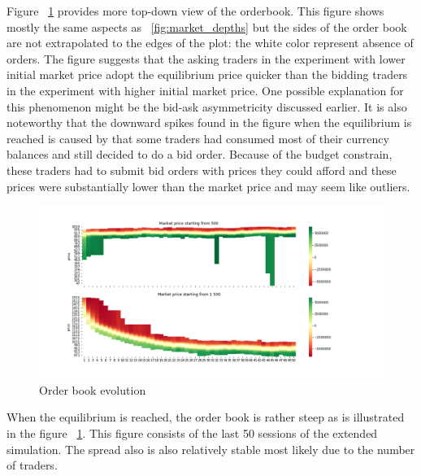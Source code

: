 Figure ~\ref{fig:basic_orderbook_evo} provides more top-down view of the orderbook.
This figure shows mostly the same aspects as ~\ref{fig:market_depths} but the sides of the 
order book are not extrapolated to the edges of the plot: the white color represent absence of orders.
The figure suggests that the asking traders in the experiment with lower initial market price
adopt the equilibrium price quicker than the bidding traders in the experiment with higher initial market 
price. One possible explanation for this phenomenon might be the bid-ask asymmetricity
discussed earlier. It is also noteworthy that the downward spikes found in the figure when the equilibrium
is reached is caused by that some traders had consumed most of their currency balances and still decided 
to do a bid order. Because of the budget constrain, these traders had to submit bid orders with prices
they could afford and these prices were substantially lower than the market price and may seem like outliers.


\begin{figure}
    \includegraphics[width=\linewidth]{plots/basic_order_book_evo.png}
    \caption{Order book evolution}
    \label{fig:basic_orderbook_evo}
\end{figure}

When the equilibrium is reached, the order book is rather steep as is illustrated in the figure
~\ref{fig:basic_orderbook_evo}. This figure consists of the last 50 sessions of the extended simulation.
The spread also is also relatively stable most likely due to the number of traders. 

